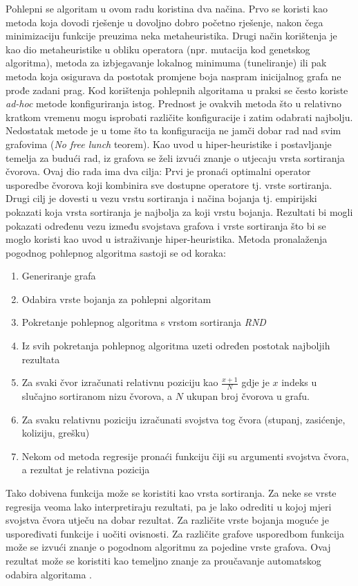 \documentclass[times, utf8, diplomski, numeric]{fer}
\begin{document}
Pohlepni se algoritam u ovom radu koristina dva načina. Prvo se koristi kao metoda koja dovodi rješenje u dovoljno dobro početno rješenje, nakon čega minimizaciju funkcije preuzima neka metaheuristika. Drugi način korištenja je kao dio metaheuristike u obliku operatora (npr. mutacija kod genetskog algoritma), metoda za izbjegavanje lokalnog minimuma (tuneliranje) ili pak metoda koja osigurava da postotak promjene boja naspram inicijalnog grafa ne prođe zadani prag. Kod korištenja pohlepnih algoritama u praksi se često koriste \emph{ad-hoc} metode konfiguriranja istog. Prednost je ovakvih metoda što u relativno kratkom vremenu mogu isprobati različite konfiguracije i zatim odabrati najbolju. Nedostatak metode je u tome što ta konfiguracija ne jamči dobar rad nad svim grafovima (\emph{No free lunch} teorem). Kao uvod u hiper-heuristike i postavljanje temelja za budući rad, iz grafova se želi izvući znanje o utjecaju vrsta sortiranja čvorova. Ovaj dio rada ima dva cilja: Prvi je pronaći optimalni operator usporedbe čvorova koji kombinira sve dostupne operatore tj. vrste sortiranja. Drugi cilj je dovesti u vezu vrstu sortiranja i načina bojanja tj. empirijski pokazati koja vrsta sortiranja je najbolja za koji vrstu bojanja. Rezultati bi mogli pokazati određenu vezu između svojstava grafova i vrste sortiranja što bi se moglo koristi kao uvod u istraživanje hiper-heuristika. Metoda pronalaženja pogodnog pohlepnog algoritma sastoji se od koraka:

\begin{enumerate}
	\item Generiranje grafa
	\item Odabira vrste bojanja za pohlepni algoritam
	\item Pokretanje pohlepnog algoritma s vrstom sortiranja \emph{RND}
	\item Iz svih pokretanja pohlepnog algoritma uzeti određen postotak najboljih rezultata
	\item Za svaki čvor izračunati relativnu poziciju kao $\frac{x+1}{N}$ gdje je $x$ indeks u slučajno sortiranom nizu čvorova, a $N$ ukupan broj čvorova u grafu. 
	\item Za svaku relativnu poziciju izračunati svojstva tog čvora (stupanj, zasićenje, koliziju, grešku)
	\item Nekom od metoda regresije pronaći funkciju čiji su argumenti svojstva čvora, a rezultat je relativna pozicija
\end{enumerate}

Tako dobivena funkcija može se koristiti kao vrsta sortiranja. Za neke se vrste regresija veoma lako interpretiraju rezultati, pa je lako odrediti u kojoj mjeri svojstva čvora utječu na dobar rezultat. Za različite vrste bojanja moguće je uspoređivati funkcije i uočiti ovisnosti. Za različite grafove usporedbom funkcija može se izvući znanje o pogodnom algoritmu za pojedine vrste grafova. Ovaj rezultat može se koristiti kao temeljno znanje za proučavanje automatskog odabira algoritama \cite{lit14}.
\end{document}
